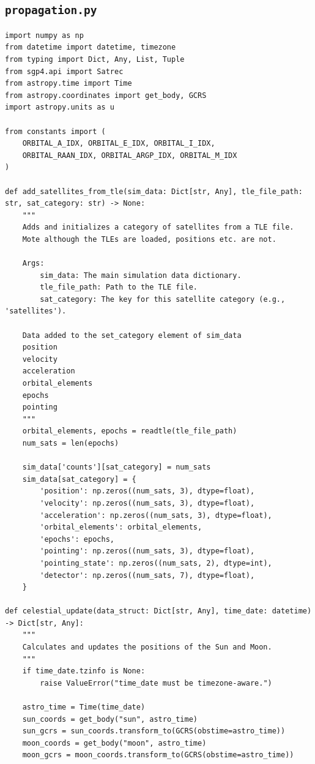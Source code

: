 \documentclass[11pt]{article}
\begin{document}
\subsection{\texttt{propagation.py}}
\begin{Verbatim}
import numpy as np
from datetime import datetime, timezone
from typing import Dict, Any, List, Tuple
from sgp4.api import Satrec
from astropy.time import Time
from astropy.coordinates import get_body, GCRS
import astropy.units as u

from constants import (
    ORBITAL_A_IDX, ORBITAL_E_IDX, ORBITAL_I_IDX,
    ORBITAL_RAAN_IDX, ORBITAL_ARGP_IDX, ORBITAL_M_IDX
)

def add_satellites_from_tle(sim_data: Dict[str, Any], tle_file_path: str, sat_category: str) -> None:
    """
    Adds and initializes a category of satellites from a TLE file.
    Mote although the TLEs are loaded, positions etc. are not.

    Args:
        sim_data: The main simulation data dictionary.
        tle_file_path: Path to the TLE file.
        sat_category: The key for this satellite category (e.g., 'satellites').

    Data added to the set_category element of sim_data
    position
    velocity
    acceleration
    orbital_elements
    epochs
    pointing
    """
    orbital_elements, epochs = readtle(tle_file_path)
    num_sats = len(epochs)

    sim_data['counts'][sat_category] = num_sats
    sim_data[sat_category] = {
        'position': np.zeros((num_sats, 3), dtype=float),
        'velocity': np.zeros((num_sats, 3), dtype=float),
        'acceleration': np.zeros((num_sats, 3), dtype=float),
        'orbital_elements': orbital_elements,
        'epochs': epochs,
        'pointing': np.zeros((num_sats, 3), dtype=float),
        'pointing_state': np.zeros((num_sats, 2), dtype=int),
        'detector': np.zeros((num_sats, 7), dtype=float),
    }

def celestial_update(data_struct: Dict[str, Any], time_date: datetime) -> Dict[str, Any]:
    """
    Calculates and updates the positions of the Sun and Moon.
    """
    if time_date.tzinfo is None:
        raise ValueError("time_date must be timezone-aware.")

    astro_time = Time(time_date)
    sun_coords = get_body("sun", astro_time)
    sun_gcrs = sun_coords.transform_to(GCRS(obstime=astro_time))
    moon_coords = get_body("moon", astro_time)
    moon_gcrs = moon_coords.transform_to(GCRS(obstime=astro_time))


\end{Verbatim}
\end{document}
